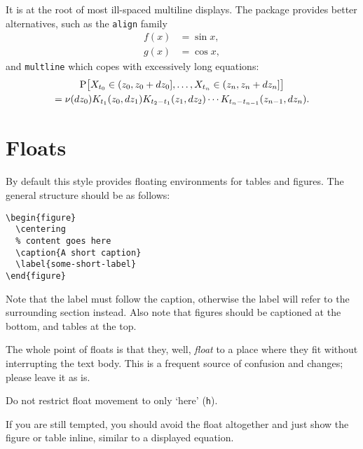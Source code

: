 It is at the root of most ill-spaced multiline displays.  The
 package provides better alternatives, such as the
\lstinline-align- family
\begin{align*}
  f(x) &= \sin x, \\
  g(x) &= \cos x,
\end{align*}
and \lstinline-multline- which copes with excessively long equations:
\begin{multline*}
  \def\P{\mathrm P}
  \P\bigl[X_{t_0} \in (z_0, z_0+dz_0],\ldots, X_{t_n}\in(z_n,z_n+dz_n]\bigr]
  \\= \nu(dz_0) K_{t_1}(z_0,dz_1) K_{t_2-t_1}(z_1,dz_2)\cdots
  K_{t_n-t_{n-1}}(z_{n-1},dz_n).
\end{multline*}


\section{Floats}

By default this style provides floating environments for tables and
figures.  The general structure should be as follows:
\begin{lstlisting}
\begin{figure}
  \centering
  % content goes here
  \caption{A short caption}
  \label{some-short-label}
\end{figure}
\end{lstlisting}
Note that the label must follow the caption, otherwise the label will
refer to the surrounding section instead.  Also note that figures
should be captioned at the bottom, and tables at the top.

The whole point of floats is that they, well, \emph{float} to a place
where they fit without interrupting the text body.  This is a frequent
source of confusion and changes; please leave it as is.

\begin{Rule}
  Do not restrict float movement to only `here'
  \textnormal{(\lstinline-h-)}.
\end{Rule}

If you are still tempted, you should avoid the float altogether and
just show the figure or table inline, similar to a displayed equation.

